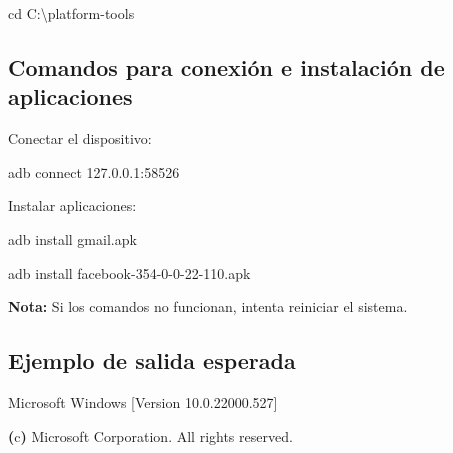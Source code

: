 \documentclass[
  doc,
  floatsintext,
  longtable,
  a4paper,
  nolmodern,
  notxfonts,
  notimes,
  12pt,
  colorlinks=true,linkcolor=blue,citecolor=blue,urlcolor=blue]{apa7}
\newenvironment{Shaded}{\begin{snugshade}}{\end{snugshade}}
\newcommand{\BuiltInTok}[1]{\textcolor[rgb]{0.00,0.23,0.31}{#1}}
\newcommand{\DataTypeTok}[1]{\textcolor[rgb]{0.68,0.00,0.00}{#1}}
\newcommand{\ExtensionTok}[1]{\textcolor[rgb]{0.00,0.23,0.31}{#1}}
\newcommand{\KeywordTok}[1]{\textcolor[rgb]{0.00,0.23,0.31}{\textbf{#1}}}
\newcommand{\NormalTok}[1]{\textcolor[rgb]{0.00,0.23,0.31}{#1}}
\begin{document}
\begin{Shaded}
\begin{Highlighting}[]

\BuiltInTok{cd}\NormalTok{ C:}\DataTypeTok{\textbackslash{}p}\NormalTok{latform{-}tools}
\end{Highlighting}
\end{Shaded}

\subsection{Comandos para conexión e instalación de
aplicaciones}\label{comandos-para-conexiuxf3n-e-instalaciuxf3n-de-aplicaciones}

Conectar el dispositivo:

\begin{Shaded}
\begin{Highlighting}[]

\ExtensionTok{adb}\NormalTok{ connect 127.0.0.1:58526}
\end{Highlighting}
\end{Shaded}

Instalar aplicaciones:

\begin{Shaded}
\begin{Highlighting}[]

\ExtensionTok{adb}\NormalTok{ install gmail.apk}
\end{Highlighting}
\end{Shaded}

\begin{Shaded}
\begin{Highlighting}[]

\ExtensionTok{adb}\NormalTok{ install facebook{-}354{-}0{-}0{-}22{-}110.apk}
\end{Highlighting}
\end{Shaded}

\textbf{Nota:} Si los comandos no funcionan, intenta reiniciar el
sistema.

\subsection{Ejemplo de salida
esperada}\label{ejemplo-de-salida-esperada}

\begin{Shaded}
\begin{Highlighting}[]

\ExtensionTok{Microsoft}\NormalTok{ Windows [Version 10.0.22000.527]}

\KeywordTok{(}\ExtensionTok{c}\KeywordTok{)} \ExtensionTok{Microsoft}\NormalTok{ Corporation. All rights reserved.}
\end{Highlighting}
\end{Shaded}
\end{document}
